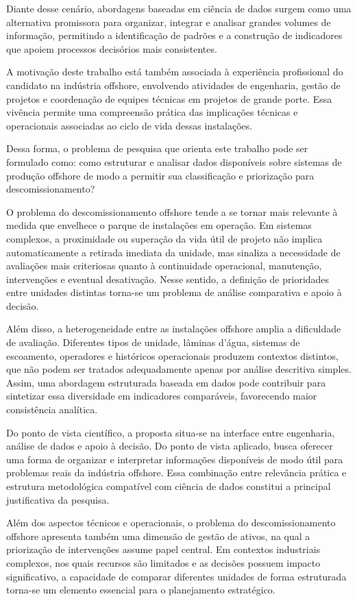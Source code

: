 \documentclass[a4paper,12pt]{article}
\begin{document}
Diante desse cenário, abordagens baseadas em ciência de dados surgem como uma alternativa promissora para organizar, integrar e analisar grandes volumes de informação, permitindo a identificação de padrões e a construção de indicadores que apoiem processos decisórios mais consistentes.

A motivação deste trabalho está também associada à experiência profissional do candidato na indústria offshore, envolvendo atividades de engenharia, gestão de projetos e coordenação de equipes técnicas em projetos de grande porte. Essa vivência permite uma compreensão prática das implicações técnicas e operacionais associadas ao ciclo de vida dessas instalações.

Dessa forma, o problema de pesquisa que orienta este trabalho pode ser formulado como: como estruturar e analisar dados disponíveis sobre sistemas de produção offshore de modo a permitir sua classificação e priorização para descomissionamento?

O problema do descomissionamento offshore tende a se tornar mais relevante à medida que envelhece o parque de instalações em operação. Em sistemas complexos, a proximidade ou superação da vida útil de projeto não implica automaticamente a retirada imediata da unidade, mas sinaliza a necessidade de avaliações mais criteriosas quanto à continuidade operacional, manutenção, intervenções e eventual desativação. Nesse sentido, a definição de prioridades entre unidades distintas torna-se um problema de análise comparativa e apoio à decisão.

Além disso, a heterogeneidade entre as instalações offshore amplia a dificuldade de avaliação. Diferentes tipos de unidade, lâminas d'água, sistemas de escoamento, operadores e históricos operacionais produzem contextos distintos, que não podem ser tratados adequadamente apenas por análise descritiva simples. Assim, uma abordagem estruturada baseada em dados pode contribuir para sintetizar essa diversidade em indicadores comparáveis, favorecendo maior consistência analítica.

Do ponto de vista científico, a proposta situa-se na interface entre engenharia, análise de dados e apoio à decisão. Do ponto de vista aplicado, busca oferecer uma forma de organizar e interpretar informações disponíveis de modo útil para problemas reais da indústria offshore. Essa combinação entre relevância prática e estrutura metodológica compatível com ciência de dados constitui a principal justificativa da pesquisa.

Além dos aspectos técnicos e operacionais, o problema do descomissionamento offshore apresenta também uma dimensão de gestão de ativos, na qual a priorização de intervenções assume papel central. Em contextos industriais complexos, nos quais recursos são limitados e as decisões possuem impacto significativo, a capacidade de comparar diferentes unidades de forma estruturada torna-se um elemento essencial para o planejamento estratégico.
\end{document}
